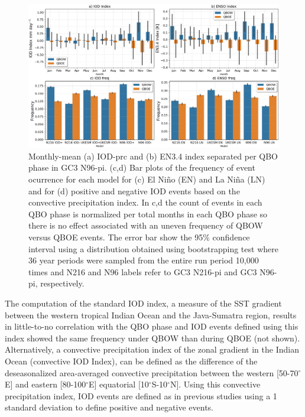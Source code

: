 \begin{figure}[t!]
\centering
 \noindent
 \includegraphics[width=\linewidth]{figures/iod_barplot.png}
\caption[IOD and ENSO frequency changes on QBO phase.]{ Monthly-mean (a) IOD-prc and (b) EN3.4 index separated per QBO phase in GC3 N96-pi. (c,d) Bar plots of the frequency of event ocurrence for each model for (c) El Niño (EN) and La Niña (LN) and for (d) positive and negative IOD events based on the convective precipitation index. In c,d the count of events in each QBO phase is normalized per total months in each QBO phase  so there is no effect associated with an uneven frequency of QBOW versus QBOE events. The error bar show the 95\% confidence interval using a distribution obtained using bootstrapping test where 36 year periods were sampled from the entire run period  10,000 times  and N216 and N96 labels refer to GC3 N216-pi and GC3 N96-pi, respectively.}
\label{fig:iod_barplot}
\end{figure}

The computation of the standard IOD index, a measure of the SST gradient between the western tropical Indian Ocean and the Java-Sumatra region, results in little-to-no correlation with the QBO phase and IOD events defined using this index showed the same frequency under QBOW than during QBOE (not shown). 
Alternatively, a convective precipitation index of the zonal gradient in the Indian Ocean (convective IOD Index), can be defined as the difference of the deseasonalized area-averaged convective precipitation between the western [50-70$^\circ$E] and eastern [80-100$^\circ$E] equatorial [10$^\circ$S-10$^\circ$N]. 
Using this convective precipitation index, IOD events are defined as in previous studies using a 1 standard deviation to define positive and negative events. 

